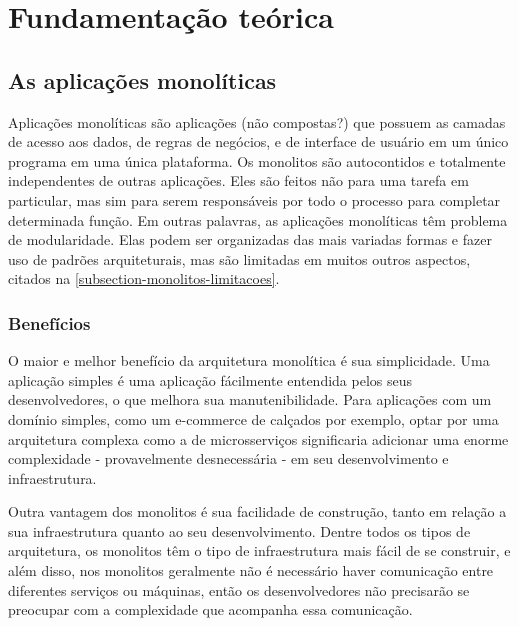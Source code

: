 \chapter{Fundamentação teórica}\label{chapter-fundamentacao}


\section{As aplicações monolíticas}

Aplicações monolíticas são aplicações (não compostas?) que possuem as camadas de acesso aos dados, de regras de negócios, e de interface de usuário em um único programa em uma única plataforma. Os monolitos são autocontidos e totalmente independentes de outras aplicações. Eles são feitos não para uma tarefa em particular, mas sim para serem responsáveis por todo o processo para completar determinada função. Em outras palavras, as aplicações monolíticas têm problema de modularidade. Elas podem ser organizadas das mais variadas formas e fazer uso de padrões arquiteturais, mas são limitadas em muitos outros aspectos, citados na \autoref{subsection-monolitos-limitacoes}.

\subsection{Benefícios}

O maior e melhor benefício da arquitetura monolítica é sua simplicidade. Uma aplicação simples é uma aplicação fácilmente entendida pelos seus desenvolvedores, o que melhora sua manutenibilidade. Para aplicações com um domínio simples, como um e-commerce de calçados por exemplo, optar por uma arquitetura complexa como a de microsserviços significaria adicionar uma enorme complexidade - provavelmente desnecessária - em seu desenvolvimento e infraestrutura.

Outra vantagem dos monolitos é sua facilidade de construção, tanto em relação a sua infraestrutura quanto ao seu desenvolvimento. Dentre todos os tipos de arquitetura, os monolitos têm o tipo de infraestrutura mais fácil de se construir, e além disso, nos monolitos geralmente não é necessário haver comunicação entre diferentes serviços ou máquinas, então os desenvolvedores não precisarão se preocupar com a complexidade que acompanha essa comunicação.

